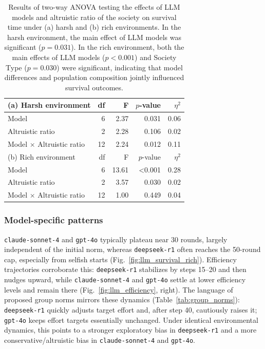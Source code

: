 \documentclass[sigconf]{aamas}
\newcommand{\tabref}[1]{Table~\ref{#1}}
\newcommand{\figref}[1]{Fig.~\ref{#1}}
\begin{document}
\begin{table}[t]
\caption{Results of two-way ANOVA testing the effects of LLM models and altruistic ratio of the society on survival time under (a) harsh and (b) rich environments. In the harsh environment, the main effect of LLM models was significant ($p = 0.031$). In the rich environment, both the main effects of LLM models ($p < 0.001$) and Society Type ($p = 0.030$) were significant, indicating that model differences and population composition jointly influenced survival outcomes.}
\label{tab:survival_anova}
\begin{tabular}{lrrrr}
\toprule
(a) Harsh environment           & df & F     & $p$-value       & $\eta^2$ \\
\midrule
Model                           & 6  & 2.37  & 0.031           & 0.06     \\
Altruistic ratio                & 2  & 2.28  & 0.106           & 0.02     \\
Model $\times$ Altruistic ratio & 12 & 2.24  & 0.012           & 0.11     \\
\midrule
(b) Rich environment            & df & F     & $p$-value       & $\eta^2$ \\
\midrule
Model                           & 6  & 13.61 & \textless 0.001 & 0.28     \\
Altruistic ratio                & 2  & 3.57  & 0.030           & 0.02     \\
Model $\times$ Altruistic ratio & 12 & 1.00  & 0.449           & 0.04     \\
\bottomrule
\end{tabular}
\end{table}

\subsubsection{\textbf{Model-specific patterns}}
\texttt{claude-sonnet-4} and \texttt{gpt-4o} typically plateau near 30 rounds, largely independent of the initial norm, whereas \texttt{deepseek-r1} often reaches the 50-round cap, especially from selfish starts (\figref{fig:llm_survival_rich}). 
Efficiency trajectories corroborate this: \texttt{deepseek-r1} stabilizes by steps 15--20 and then nudges upward, while \texttt{claude-sonnet-4} and \texttt{gpt-4o} settle at lower efficiency levels and remain there (\figref{fig:llm_efficiency}, right). 
The language of proposed group norms mirrors these dynamics (\tabref{tab:group_norms}): \texttt{deepseek-r1} quickly adjusts target effort and, after step 40, cautiously raises it; \texttt{gpt-4o} keeps effort targets essentially unchanged. 
Under identical environmental dynamics, this points to a stronger exploratory bias in \texttt{deepseek-r1} and a more conservative/altruistic bias in \texttt{claude-sonnet-4} and \texttt{gpt-4o}.
\end{document}

